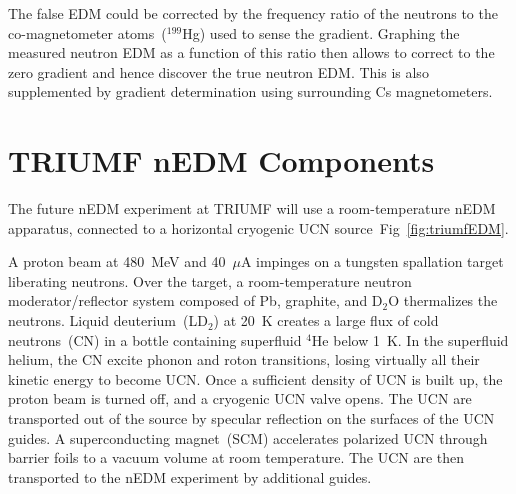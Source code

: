 The false EDM could be corrected by the frequency ratio of the
neutrons to the co-magnetometer atoms~($^{199}$Hg) used to sense the
gradient. Graphing the measured neutron EDM as a function of this
ratio then allows to correct to the zero gradient and hence discover
the true neutron EDM. This is also supplemented by gradient
determination using surrounding Cs magnetometers.





\section{TRIUMF nEDM Components}
The future nEDM experiment at TRIUMF will use a room-temperature nEDM
apparatus, connected to a horizontal cryogenic UCN
source~Fig~\ref{fig:triumfEDM}.

A proton beam at 480~MeV and 40~$\mu$A impinges on a tungsten
spallation target liberating neutrons. Over the target, a
room-temperature neutron moderator/reflector system composed of Pb,
graphite, and D$_2$O thermalizes the neutrons. Liquid
deuterium~(LD$_2$) at 20~K creates a large flux of cold neutrons~(CN)
in a bottle containing superfluid $^4$He below 1~K. In the superfluid helium,
the CN excite phonon and roton transitions, losing virtually all their
kinetic energy to become UCN. Once a sufficient density of UCN is
built up, the proton beam is turned off, and a cryogenic UCN valve
opens. The UCN are transported out of the source by specular
reflection on the surfaces of the UCN guides. A superconducting
magnet~(SCM) accelerates polarized UCN through barrier foils to a
vacuum volume at room temperature. The UCN are then transported to the
nEDM experiment by additional guides.

